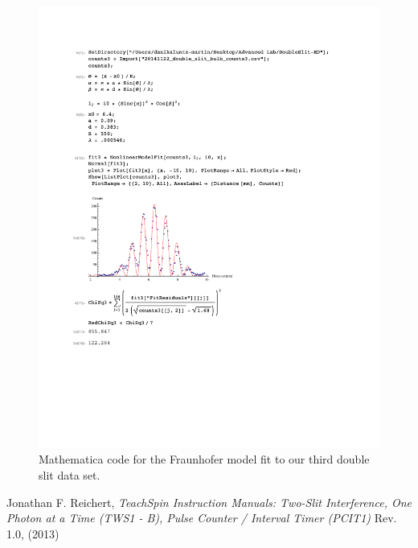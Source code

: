 \documentclass[prb,preprint]{revtex4-1}
\begin{document}
\begin{figure}[h!]
\centering
\includegraphics[width=6in]{DoubleSlitFraun3.pdf}
\caption{Mathematica code for the Fraunhofer model fit to our third double slit data set.}
\label{DoubleSlitFraun3}
\end{figure}



\begin{thebibliography}{1}

 Jonathan F. Reichert, \textit{TeachSpin Instruction Manuals: Two-Slit Interference, One Photon at a Time (TWS1 - B), Pulse Counter / Interval Timer (PCIT1)} Rev. 1.0, (2013)

\end{thebibliography}
\end{document}
